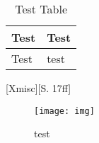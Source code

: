 \begin{table}[H]
    \caption{Test Table}
    \begin{tabular}{| l | l |}
        Test & Test\\
        \hline Test & test
    \end{tabular}
\end{table}

[Xmisc][S. 17ff]

\begin{figure}[H]
    \centering
    \caption{test}
    \texttt{[image: img]}
    \label{fig:anlagentest2}
\end{figure}

